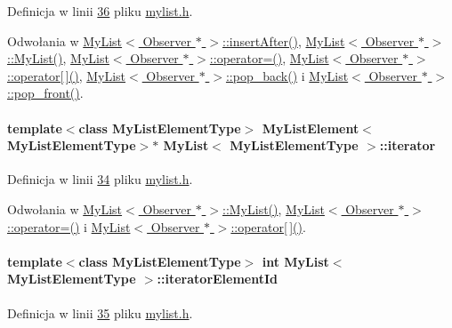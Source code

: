 Definicja w linii \hyperlink{mylist_8h_source_l00036}{36} pliku \hyperlink{mylist_8h_source}{mylist.\-h}.



Odwołania w \hyperlink{mylist_8h_source_l00212}{My\-List$<$ Observer $\ast$ $>$\-::insert\-After()}, \hyperlink{mylist_8h_source_l00039}{My\-List$<$ Observer $\ast$ $>$\-::\-My\-List()}, \hyperlink{mylist_8h_source_l00234}{My\-List$<$ Observer $\ast$ $>$\-::operator=()}, \hyperlink{mylist_8h_source_l00171}{My\-List$<$ Observer $\ast$ $>$\-::operator\mbox{[}$\,$\mbox{]}()}, \hyperlink{mylist_8h_source_l00084}{My\-List$<$ Observer $\ast$ $>$\-::pop\-\_\-back()} i \hyperlink{mylist_8h_source_l00098}{My\-List$<$ Observer $\ast$ $>$\-::pop\-\_\-front()}.

\hypertarget{class_my_list_aecf059ed6926a3d6eb82641d46a3e3ff}{
\paragraph[{iterator}]{\setlength{\rightskip}{0pt plus 5cm}template$<$class My\-List\-Element\-Type$>$ {\bf My\-List\-Element}$<$My\-List\-Element\-Type$>$$\ast$ {\bf My\-List}$<$ My\-List\-Element\-Type $>$\-::iterator}}\label{class_my_list_aecf059ed6926a3d6eb82641d46a3e3ff}


Definicja w linii \hyperlink{mylist_8h_source_l00034}{34} pliku \hyperlink{mylist_8h_source}{mylist.\-h}.



Odwołania w \hyperlink{mylist_8h_source_l00039}{My\-List$<$ Observer $\ast$ $>$\-::\-My\-List()}, \hyperlink{mylist_8h_source_l00234}{My\-List$<$ Observer $\ast$ $>$\-::operator=()} i \hyperlink{mylist_8h_source_l00171}{My\-List$<$ Observer $\ast$ $>$\-::operator\mbox{[}$\,$\mbox{]}()}.

\hypertarget{class_my_list_ad27795091bcc0c321d81c2196bc1cbb0}{
\paragraph[{iterator\-Element\-Id}]{\setlength{\rightskip}{0pt plus 5cm}template$<$class My\-List\-Element\-Type$>$ int {\bf My\-List}$<$ My\-List\-Element\-Type $>$\-::iterator\-Element\-Id}}\label{class_my_list_ad27795091bcc0c321d81c2196bc1cbb0}


Definicja w linii \hyperlink{mylist_8h_source_l00035}{35} pliku \hyperlink{mylist_8h_source}{mylist.\-h}.



